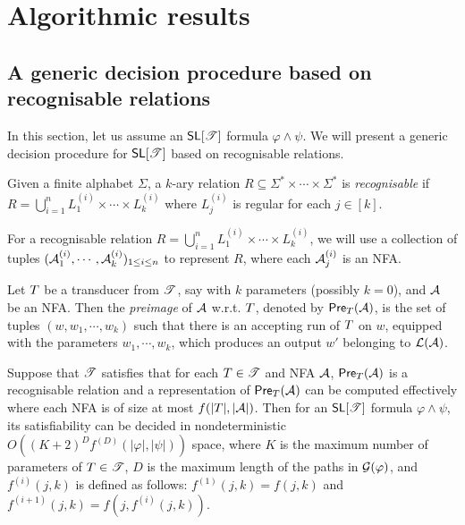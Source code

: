 
\section{Algorithmic results}
\label{sec:algo}


\subsection{A generic decision procedure based on recognisable relations}

In this section, let us assume an $\textsf{SL}[\mathscr{T}]$ formula $\varphi \wedge \psi$.
We will present a generic decision procedure for $\textsf{SL}[\mathscr{T}]$ based on recognisable relations.

\begin{definition}
	Given a finite alphabet $\Sigma$, a $k$-ary relation $R\subseteq \Sigma^*\times \cdots\times \Sigma^*$ is \emph{recognisable}  if $R=\bigcup_{i=1}^n L^{(i)}_1\times \cdots\times L^{(i)}_k$ where $L^{(i)}_j$ is regular for each $j\in [k]$.
%
\end{definition}

For a recognisable relation $R=\bigcup_{i=1}^n L^{(i)}_1\times \cdots\times L^{(i)}_k$, we will use a collection of tuples $(\mathcal{A}^{(i)}_1, \cdots, \mathcal{A}^{(i)}_k)_{1 \le i \le n}$ to represent $R$, where each $\mathcal{A}^{(i)}_j$ is an NFA.  

Let $T$ be a transducer from $\mathscr{T}$, say with $k$ parameters (possibly $k=0$), and $\mathcal{A}$ be an NFA. Then the \emph{preimage} of $\mathcal{A}$ w.r.t. $T$, denoted by $\textsf{Pre}_{T}(\mathcal{A})$, is the set of tuples $(w, w_1,\cdots, w_k)$ such that there is an accepting run of $T$ on $w$, equipped with the parameters $w_1,\cdots, w_k$, which produces an output $w'$ belonging to $\mathcal{L}(\mathcal{A})$.

\begin{theorem}\label{thm-generic-dec}
Suppose that $\mathscr{T}$ satisfies that for each $T \in \mathscr{T}$ and NFA $\mathcal{A}$, $\textsf{Pre}_{T}(\mathcal{A})$ is a recognisable relation and a representation of  $\textsf{Pre}_{T}(\mathcal{A})$ can be computed effectively where each NFA is of size at most $f(|T|, |\mathcal{A}|)$. Then for an $\textsf{SL}[\mathscr{T}]$ formula $\varphi \wedge \psi$, its satisfiability can be decided in nondeterministic $O((K+2)^D f^{(D)}(|\varphi|, |\psi|))$ space, where $K$ is the maximum number of parameters of $T \in \mathscr{T}$, $D$ is the maximum length of the paths in $\mathcal{G}(\varphi)$,  and $f^{(i)}(j, k)$ is defined as follows: $f^{(1)}(j,k)= f(j, k)$ and $f^{(i+1)}(j, k) = f(j, f^{(i)}(j,k))$.
\end{theorem}

